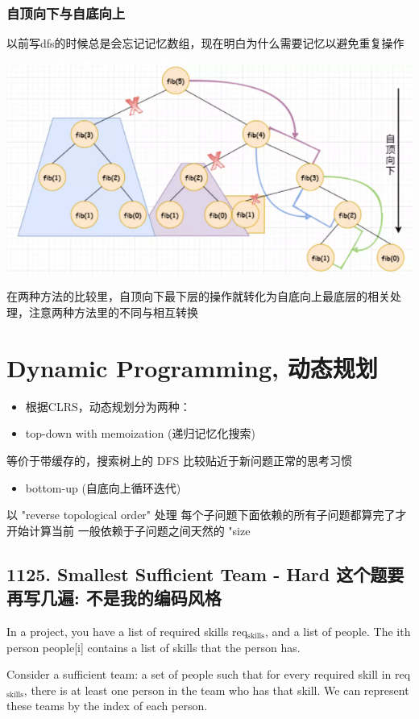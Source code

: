 \documentclass[9pt, b5paper]{article}
\begin{document}
\subsubsection{自顶向下与自底向上}
\label{sec-3-11-1}
以前写dfs的时候总是会忘记记忆数组，现在明白为什么需要记忆以避免重复操作

\includegraphics[width=.9\linewidth]{./pic/topDownfib.png}

在两种方法的比较里，自顶向下最下层的操作就转化为自底向上最底层的相关处理，注意两种方法里的不同与相互转换

\section{Dynamic Programming, 动态规划}
\label{sec-4}
\begin{itemize}
\item 根据CLRS，动态规划分为两种：
\item top-down with memoization (递归记忆化搜索)
\end{itemize}
等价于带缓存的，搜索树上的 DFS
比较贴近于新问题正常的思考习惯
\begin{itemize}
\item bottom-up (自底向上循环迭代)
\end{itemize}
以 "reverse topological order" 处理
每个子问题下面依赖的所有子问题都算完了才开始计算当前
一般依赖于子问题之间天然的 "size
\subsection{1125. Smallest Sufficient Team - Hard 这个题要再写几遍: 不是我的编码风格}
\label{sec-4-1}
In a project, you have a list of required skills req$_{\text{skills}}$, and a list of people. The ith person people[i] contains a list of skills that the person has.

Consider a sufficient team: a set of people such that for every required skill in req$_{\text{skills}}$, there is at least one person in the team who has that skill. We can represent these teams by the index of each person.
\end{document}
